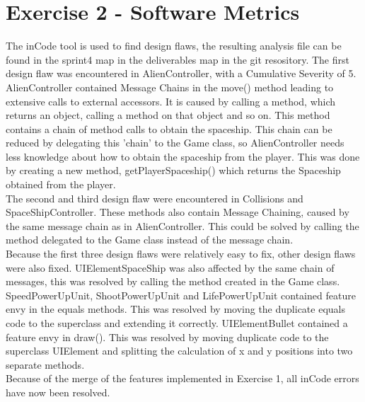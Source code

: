 
\section{Exercise 2 - Software Metrics }
The inCode tool is used to find design flaws, the resulting analysis file can be found in the sprint4 map in the deliverables map in the git resository.
The first design flaw was encountered in AlienController, with a Cumulative Severity of 5. 
AlienController contained Message Chains in the move() method leading to extensive calls to external accessors. It is caused by calling a method, which returns an object, calling a method on that object and so on. This method contains a chain of method calls to obtain the spaceship. This chain can be reduced by delegating this 'chain' to the Game class, so AlienController needs less knowledge about how to obtain the spaceship from the player. This was done by creating a new method, getPlayerSpaceship() which returns the Spaceship obtained from the player.\\

The second and third design flaw were encountered in Collisions and SpaceShipController. These methods also contain Message Chaining, caused by the same message chain as in AlienController. This could be solved by calling the method delegated to the Game class instead of the message chain.\\

Because the first three design flaws were relatively easy to fix, other design flaws were also fixed. 
UIElementSpaceShip was also affected by the same chain of messages, this was resolved by calling the method created in the Game class. SpeedPowerUpUnit, ShootPowerUpUnit and LifePowerUpUnit contained feature envy in the equals methods. This was resolved by moving the duplicate equals code to the superclass and extending it correctly. UIElementBullet contained a feature envy in draw(). This was resolved by moving duplicate code to the superclass UIElement and splitting the calculation of x and y positions into two separate methods.\\

Because of the merge of the features implemented in Exercise 1, all inCode errors have now been resolved.